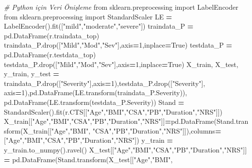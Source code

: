 \documentclass[12pt,twoside]{deuthesis}
\newenvironment{Shaded}{\begin{snugshade}}{\end{snugshade}}
\newcommand{\CommentTok}[1]{\textcolor[rgb]{0.56,0.35,0.01}{\textit{#1}}}
\newcommand{\DecValTok}[1]{\textcolor[rgb]{0.00,0.00,0.81}{#1}}
\newcommand{\ImportTok}[1]{#1}
\newcommand{\NormalTok}[1]{#1}
\newcommand{\OperatorTok}[1]{\textcolor[rgb]{0.81,0.36,0.00}{\textbf{#1}}}
\newcommand{\StringTok}[1]{\textcolor[rgb]{0.31,0.60,0.02}{#1}}
\newcommand{\VariableTok}[1]{\textcolor[rgb]{0.00,0.00,0.00}{#1}}
\begin{document}
\begin{Shaded}
\begin{Highlighting}[]
\CommentTok{\# Python için Veri Önişleme }
\ImportTok{from}\NormalTok{ sklearn.preprocessing }\ImportTok{import}\NormalTok{ LabelEncoder}
\ImportTok{from}\NormalTok{ sklearn.preprocessing }\ImportTok{import}\NormalTok{ StandardScaler}
\NormalTok{LE }\OperatorTok{=}\NormalTok{ LabelEncoder().fit([}\StringTok{"mild"}\NormalTok{,}\StringTok{"moderate"}\NormalTok{,}\StringTok{"severe"}\NormalTok{])}
\NormalTok{traindata\_P }\OperatorTok{=}\NormalTok{ pd.DataFrame(r.traindata\_top)}
\NormalTok{traindata\_P.drop([}\StringTok{"Mild"}\NormalTok{,}\StringTok{"Mod"}\NormalTok{,}\StringTok{"Sev"}\NormalTok{],axis}\OperatorTok{=}\DecValTok{1}\NormalTok{,inplace}\OperatorTok{=}\VariableTok{True}\NormalTok{)}
\NormalTok{testdata\_P }\OperatorTok{=}\NormalTok{ pd.DataFrame(r.testdata\_top)}
\NormalTok{testdata\_P.drop([}\StringTok{"Mild"}\NormalTok{,}\StringTok{"Mod"}\NormalTok{,}\StringTok{"Sev"}\NormalTok{],axis}\OperatorTok{=}\DecValTok{1}\NormalTok{,inplace}\OperatorTok{=}\VariableTok{True}\NormalTok{)}
\NormalTok{X\_train, X\_test, y\_train, y\_test }\OperatorTok{=}\NormalTok{ traindata\_P.drop([}\StringTok{"Severity"}\NormalTok{],axis}\OperatorTok{=}\DecValTok{1}\NormalTok{),testdata\_P.drop([}\StringTok{"Severity"}\NormalTok{],}
\NormalTok{axis}\OperatorTok{=}\DecValTok{1}\NormalTok{),pd.DataFrame(LE.transform(traindata\_P.Severity)),}
\NormalTok{pd.DataFrame(LE.transform(testdata\_P.Severity))}
\NormalTok{Stand }\OperatorTok{=}\NormalTok{ StandardScaler().fit(r.CTS[[}\StringTok{"Age"}\NormalTok{,}\StringTok{"BMI"}\NormalTok{,}\StringTok{"CSA"}\NormalTok{,}\StringTok{"PB"}\NormalTok{,}\StringTok{"Duration"}\NormalTok{,}\StringTok{"NRS"}\NormalTok{]])}
\NormalTok{X\_train[[}\StringTok{"Age"}\NormalTok{,}\StringTok{"BMI"}\NormalTok{,}\StringTok{"CSA"}\NormalTok{,}\StringTok{"PB"}\NormalTok{,}\StringTok{"Duration"}\NormalTok{,}\StringTok{"NRS"}\NormalTok{]]}\OperatorTok{=}\NormalTok{pd.DataFrame(Stand.transform(X\_train[[}\StringTok{"Age"}\NormalTok{,}\StringTok{"BMI"}\NormalTok{,}
\StringTok{"CSA"}\NormalTok{,}\StringTok{"PB"}\NormalTok{,}\StringTok{"Duration"}\NormalTok{,}\StringTok{"NRS"}\NormalTok{]]),columns}\OperatorTok{=}\NormalTok{[}\StringTok{"Age"}\NormalTok{,}\StringTok{"BMI"}\NormalTok{,}\StringTok{"CSA"}\NormalTok{,}\StringTok{"PB"}\NormalTok{,}\StringTok{"Duration"}\NormalTok{,}\StringTok{"NRS"}\NormalTok{])}
\NormalTok{y\_train }\OperatorTok{=}\NormalTok{ y\_train.to\_numpy().ravel()}
\NormalTok{X\_test[[}\StringTok{"Age"}\NormalTok{,}\StringTok{"BMI"}\NormalTok{,}\StringTok{"CSA"}\NormalTok{,}\StringTok{"PB"}\NormalTok{,}\StringTok{"Duration"}\NormalTok{,}\StringTok{"NRS"}\NormalTok{]] }\OperatorTok{=}\NormalTok{ pd.DataFrame(Stand.transform(X\_test[[}\StringTok{"Age"}\NormalTok{,}\StringTok{"BMI"}\NormalTok{,}

\end{Highlighting}
\end{Shaded}
\end{document}

